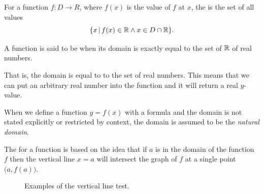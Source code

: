 \begin{defn}
  For a function $f: D \rightarrow R$,
  where $f(x)$ is the value of $f$ at $x$,
  the 
  is the set of all values
  \begin{equation}
    \{ { x } \,|\, { f(x) \in \mathbb{R} \land  x \in D \cap \mathbb{R} } \}.
    \label{eq:functions:naturaldomain}
  \end{equation}
\end{defn}

\begin{defn}
  A function is said to be  when
  its domain is exactly equal to the set of $\mathbb{R}$ of real numbers.
\end{defn}

That is, the domain is equal to to the set of real numbers.
This means that we can put an arbitrary real number into the function and it 
will return a real $y$-value.

 \begin{remark}
     When we define a function $y=f(x)$ with a formula and the domain is not 
     stated explicitly or restricted by context, the domain is assumed to be the 
     \emph{natural domain}.
   \end{remark}

The 
for a function is based on the idea that if
$a$ is in the domain of the function $f$ then the vertical line $x=a$ will 
intersect the graph of $f$ at a single point $ \big(a,f(a)\big)$.

\begin{figure}
  \begin{center}
  \end{center}
  \caption{Examples of the vertical line test.}
\end{figure}


